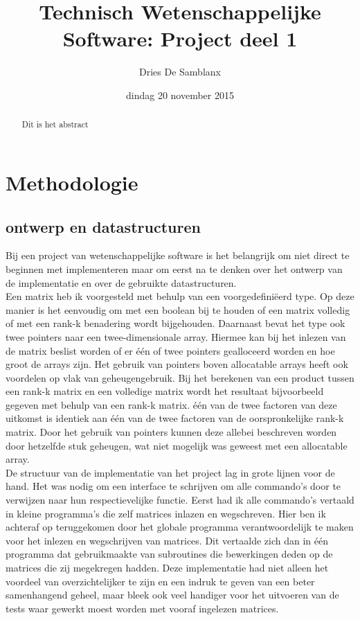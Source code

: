 \documentclass[a4paper]{article}
\title{Technisch Wetenschappelijke Software: Project deel 1}
\author{Dries De Samblanx}
\date{dindag 20 november 2015}
\begin{document}
\maketitle

\begin{abstract}

Dit is het abstract

\end{abstract}

\section*{Methodologie}

\subsection*{ontwerp en datastructuren}

Bij een project van wetenschappelijke software is het belangrijk om niet direct te beginnen met implementeren maar om eerst na te denken over het ontwerp van de implementatie en over de gebruikte datastructuren.\\ 
Een matrix heb ik voorgesteld met behulp van een voorgedefini\"eerd type. Op deze manier is het eenvoudig om met een boolean bij te houden of een matrix volledig of met een rank-k benadering wordt bijgehouden. Daarnaast bevat het type ook twee pointers naar een twee-dimensionale array. Hiermee kan bij het inlezen van de matrix beslist worden of er \'e\'en of twee pointers gealloceerd worden en hoe groot de arrays zijn. Het gebruik van pointers boven allocatable arrays heeft ook voordelen op vlak van geheugengebruik. Bij het berekenen van een product tussen een rank-k matrix en een volledige matrix wordt het resultaat bijvoorbeeld gegeven met behulp van een rank-k matrix. \'e\'en van de twee factoren van deze uitkomst is identiek aan \'e\'en van de twee factoren van de oorspronkelijke rank-k matrix. Door het gebruik van pointers kunnen deze allebei beschreven worden door hetzelfde stuk geheugen, wat niet mogelijk was geweest met een allocatable array. \\
De structuur van de implementatie van het project lag in grote lijnen voor de hand. Het was nodig om een interface te schrijven om alle commando's door te verwijzen naar hun respectievelijke functie. Eerst had ik alle commando's vertaald in kleine programma's die zelf matrices inlazen en wegschreven. Hier ben ik achteraf op teruggekomen door het globale programma verantwoordelijk te maken voor het inlezen en wegschrijven van matrices. Dit vertaalde zich dan in \'e\'en programma dat gebruikmaakte van subroutines die bewerkingen deden op de matrices die zij megekregen hadden. Deze implementatie had niet alleen het voordeel van overzichtelijker te zijn en een indruk te geven van een beter samenhangend geheel, maar bleek ook veel handiger voor het uitvoeren van de tests waar gewerkt moest worden met vooraf ingelezen matrices. 
\end{document}
